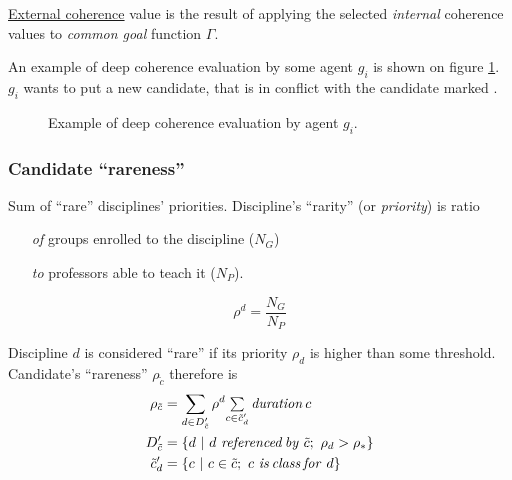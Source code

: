 \documentclass[../../ThesisDoc]{subfiles}
\begin{document}
\noindent
\underline{External coherence} value is the result of applying the selected
\emph{internal} coherence values to \emph{common goal} function $\Gamma$.

\medskip

\noindent
An example of deep coherence evaluation by some agent $g_i$ is shown on figure
\ref{fig:ConflictDeepCoherence}. $g_i$ wants to put a new candidate, that is
in conflict with the candidate marked .



\begin{figure}[h]
  \centering
  \resizebox{0.7\textwidth}{!}{
    
    }
  \caption{Example of deep coherence evaluation by agent $g_i$.}
  \label{fig:ConflictDeepCoherence}
\end{figure}



\subsubsection{Candidate ``rareness''}
Sum of ``rare'' disciplines' priorities. Discipline's ``rarity'' (or
\emph{priority}) is ratio
\begin{itemize}
  \item[\textit{of}] groups enrolled to the discipline ($N_G$)
  \item[\textit{to}] professors able to teach it ($N_P$).
\end{itemize}

$$\rho^d = \dfrac{N_G}{N_P}$$

\medskip
\noindent
Discipline $d$ is considered ``rare'' if its priority $\rho_d$ is higher than
some threshold. \\
\noindent
Candidate's ``rareness'' $\rho_{\tilde{c}}$ therefore is
\begin{align*}
  \rho_{\tilde{c}} &= \sum\limits_{d \in D'_{\tilde{c}}}
        \rho^d \mathsmaller{ \sum\limits_{c \in \tilde{c}'_d}
                              \mathit{duration}\, c }\\
  D'_{\tilde{c}} &= \lbrace d ~|~ d ~\mathit{referenced\,by}~ \tilde{c};~
                                \rho_d > \rho_* \rbrace\\
  \tilde{c}'_d &= \lbrace c ~|~ c \in \tilde{c};~ c ~\mathit{is\,class\,for}~ d \rbrace
\end{align*}
\end{document}
